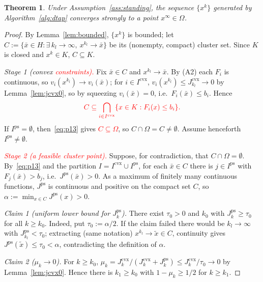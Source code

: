 \documentclass[]{interact}
\theoremstyle{plain}
\newtheorem{theorem}{Theorem}[section]
\theoremstyle{definition}
\theoremstyle{remark}
\newcommand{\cvx}{\mathrm{cvx}}
\newcommand{\ps}{\mathrm{ps}}
\begin{document}
\begin{theorem}\label{thm:strong}
Under Assumption~\ref{ass:standing}, the sequence $\{x^k\}$ generated by Algorithm~\ref{alg:dtap} converges strongly to a point $x^\infty\in\Omega$.
\end{theorem}
\begin{proof}
By Lemma~\ref{lem:bounded}, $\{x^k\}$ is bounded; let $C:=\{\bar x\in H:\exists\,k_l\to\infty,\ x^{k_l}\to\bar x\}$ be its (nonempty, compact) cluster set. Since $K$ is closed and $x^k\in K$, $C\subseteq K$.

\emph{Stage 1 (convex \leavevmode\textcolor{red}{constraints).}} Fix $\bar x\in C$ and $x^{k_l}\to\bar x$. By (A2) each $F_i$ is continuous, so $v_i(x^{k_l})\to v_i(\bar x)$; for $i\in I^{\cvx}$, $v_i(x^{k_l})\le J^{\cvx}_{k_l}\to0$ by Lemma~\ref{lem:jcvx0}, so by squeezing $v_i(\bar x)=0$, i.e.\ $F_i(\bar x)\le b_i$. Hence
\begin{equation}\label{eq:p13}\textcolor{red}{
C\subseteq\bigcap_{i\in I^{\cvx}}\{x\in K:F_i(x)\le b_i\}.
}\end{equation}
If $I^{\ps}=\emptyset$, then~\eqref{eq:p13} gives \leavevmode\textcolor{red}{$C\subseteq\Omega$}, so $C\cap\Omega=C\ne\emptyset$. Assume henceforth $I^{\ps}\ne\emptyset$.

\emph{\leavevmode\textcolor{red}{Stage 2 (a feasible cluster point).}} Suppose, for contradiction, that $C\cap\Omega=\emptyset$. By~\eqref{eq:p13} and the partition $I=I^{\cvx}\cup I^{\ps}$, for each $\bar x\in C$ there is $j\in I^{\ps}$ with $F_j(\bar x)>b_j$, i.e.\ $J^{\ps}(\bar x)>0$. As a maximum of finitely many continuous functions, $J^{\ps}$ is continuous and positive on the compact set $C$, so $\alpha:=\min_{x\in C}J^{\ps}(x)>0$.

\smallskip
\emph{Claim 1 (uniform lower bound for $J^{\ps}_k$).} There exist $\tau_0>0$ and $k_0$ with $J^{\ps}_k\ge\tau_0$ for all $k\ge k_0$. Indeed, put $\tau_0:=\alpha/2$. If the claim failed there would be $k_l\to\infty$ with $J^{\ps}_{k_l}<\tau_0$; extracting (same notation) $x^{k_l}\to\tilde x\in C$, continuity gives $J^{\ps}(\tilde x)\le\tau_0<\alpha$, contradicting the definition of $\alpha$.

\smallskip
\emph{Claim 2 ($\mu_k\to0$).} For $k\ge k_0$, $\mu_k=J^{\cvx}_k/(J^{\cvx}_k+J^{\ps}_k)\le J^{\cvx}_k/\tau_0\to0$ by Lemma~\ref{lem:jcvx0}. Hence there is $k_1\ge k_0$ with $1-\mu_k\ge1/2$ for $k\ge k_1$.


\end{proof}
\end{document}
